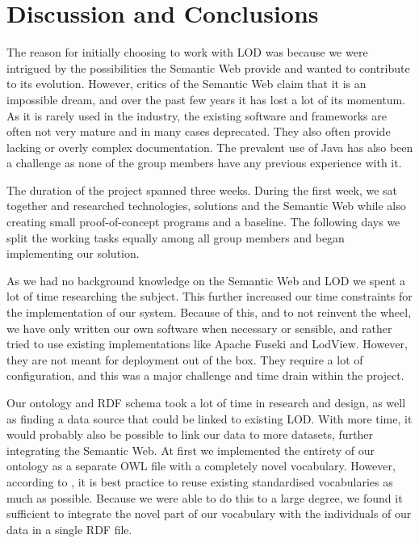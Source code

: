 \chapter{Discussion and Conclusions}

The reason for initially choosing to work with LOD was because we were intrigued by the possibilities the Semantic Web provide and wanted to contribute to its evolution. However, critics of the Semantic Web claim that it is an impossible dream, and over the past few years it has lost a lot of its momentum. As it is rarely used in the industry, the existing software and frameworks are often not very mature and in many cases deprecated. They also often provide lacking or overly complex documentation. The prevalent use of Java has also been a challenge as none of the group members have any previous experience with it. 

\vspace{5mm}

The duration of the project spanned three weeks. During the first week, we sat together and researched technologies, solutions and the Semantic Web while also creating small proof-of-concept programs and a baseline. The following days we split the working tasks equally among all group members and began implementing our solution.

\vspace{5mm}

As we had no background knowledge on the Semantic Web and LOD we spent a lot of time researching the subject. This further increased our time constraints for the implementation of our system. Because of this, and to not reinvent the wheel, we have only written our own software when necessary or sensible, and rather tried to use existing implementations like Apache Fuseki and LodView. However, they are not meant for deployment out of the box. They require a lot of configuration, and this was a major challenge and time drain within the project.

\vspace{5mm}

Our ontology and RDF schema took a lot of time in research and design, as well as finding a data source that could be linked to existing LOD. With more time, it would probably also be possible to link our data to more datasets, further integrating the Semantic Web. At first we implemented the entirety of our ontology as a separate OWL file with a completely novel vocabulary. However, according to \cite{w3-best-practices}, it is best practice to reuse existing standardised vocabularies as much as possible. Because we were able to do this to a large degree, we found it sufficient to integrate the novel part of our vocabulary with the individuals of our data in a single RDF file.

